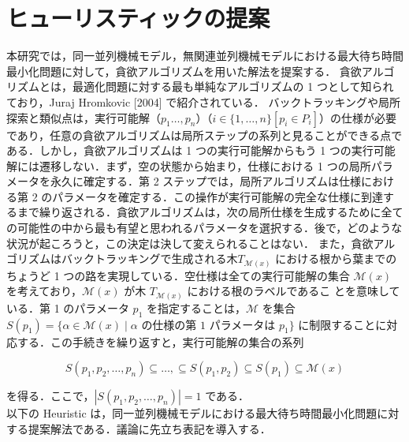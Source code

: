 \documentclass[12pt]{optlab-bachelor}
\begin{document}
\section{ヒューリスティックの提案}\label{5_s_2}
本研究では，同一並列機械モデル，無関連並列機械モデルにおける最大待ち時間最小化問題に対して，貪欲アルゴリズムを用いた解法を提案する．
貪欲アルゴリズムとは，最適化問題に対する最も単純なアルゴリズムの 1 つとして知られており，Juraj Hromkovic [2004] \cite{greedy} で紹介されている．
バックトラッキングや局所探索と類似点は，実行可能解（$p_1\ldots,p_n$）（$i \in \{1,\ldots,n\}[p_i \in P_i]$）の仕様が必要であり，任意の貪欲アルゴリズムは局所ステップの系列と見ることができる点である．しかし，貪欲アルゴリズムは 1 つの実行可能解からもう 1 つの実行可能解には遷移しない．まず，空の状態から始まり，仕様における 1 つの局所パラメータを永久に確定する．第 2 ステップでは，局所アルゴリズムは仕様における第 2 のパラメータを確定する．この操作が実行可能解の完全な仕様に到達するまで繰り返される．貪欲アルゴリズムは，次の局所仕様を生成するために全ての可能性の中から最も有望と思われるパラメータを選択する．後で，どのような状況が起ころうと，この決定は決して変えられることはない．
また，貪欲アルゴリズムはバックトラッキングで生成される木$T_{\mathcal{M}(x)}$ における根から葉までのちょうど 1 つの路を実現している．空仕様は全ての実行可能解の集合 $\mathcal{M}(x)$ を考えており，$\mathcal{M}(x)$ が木 $T_{\mathcal{M}(x)}$ における根のラベルであるこ
とを意味している．第 1 のパラメータ $p_1$ を指定することは，$\mathcal{M}$ を集合 $S(p_1) = \{\alpha \in \mathcal{M}(x) \mid \alpha \text{ の仕様の第 1 パラメータは } p_1\}$ に制限することに対応する．この手続きを繰り返すと，実行可能解の集合の系列

\begin{displaymath}
  S(p_1,p_2,\ldots,p_n) \subseteq \ldots, \subseteq S(p_1,p_2) \subseteq S(p_1) \subseteq \mathcal{M}(x)
\end{displaymath}

を得る．ここで，$|S(p_1,p_2,\ldots,p_n)| = 1$ である．\\

\noindent 以下の {\sc Heuristic} は，同一並列機械モデルにおける最大待ち時間最小化問題に対する提案解法である．議論に先立ち表記を導入する．
\end{document}
